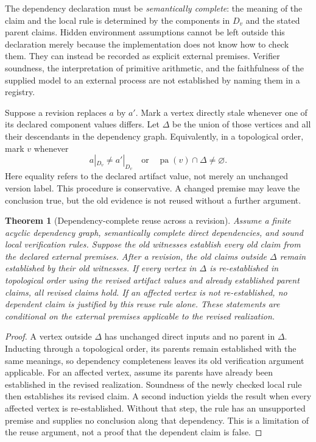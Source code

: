 \documentclass[11pt,letterpaper]{article}
\theoremstyle{plain}
\newtheorem{theorem}{Theorem}[section]
\theoremstyle{definition}
\begin{document}
The dependency declaration must be \emph{semantically complete}: the meaning of the claim and the local rule is determined by the components in $D_v$ and the stated parent claims. Hidden environment assumptions cannot be left outside this declaration merely because the implementation does not know how to check them. They can instead be recorded as explicit external premises. Verifier soundness, the interpretation of primitive arithmetic, and the faithfulness of the supplied model to an external process are not established by naming them in a registry.

Suppose a revision replaces $a$ by $a'$. Mark a vertex directly stale whenever one of its declared component values differs. Let $\Delta$ be the union of those vertices and all their descendants in the dependency graph. Equivalently, in a topological order, mark $v$ whenever
\[
 a|_{D_v}\ne a'|_{D_v}
 \quad\text{or}\quad
 \operatorname{pa}(v)\cap\Delta\ne\varnothing.
\]
Here equality refers to the declared artifact value, not merely an unchanged version label. This procedure is conservative. A changed premise may leave the conclusion true, but the old evidence is not reused without a further argument.

\begin{theorem}[Dependency-complete reuse across a revision]\label{thm:certificate-reuse}
Assume a finite acyclic dependency graph, semantically complete direct dependencies, and sound local verification rules. Suppose the old witnesses establish every old claim from the declared external premises. After a revision, the old claims outside $\Delta$ remain established by their old witnesses. If every vertex in $\Delta$ is re-established in topological order using the revised artifact values and already established parent claims, all revised claims hold. If an affected vertex is not re-established, no dependent claim is justified by this reuse rule alone. These statements are conditional on the external premises applicable to the revised realization.
\end{theorem}
\begin{proof}
A vertex outside $\Delta$ has unchanged direct inputs and no parent in $\Delta$. Inducting through a topological order, its parents remain established with the same meanings, so dependency completeness leaves its old verification argument applicable. For an affected vertex, assume its parents have already been established in the revised realization. Soundness of the newly checked local rule then establishes its revised claim. A second induction yields the result when every affected vertex is re-established. Without that step, the rule has an unsupported premise and supplies no conclusion along that dependency. This is a limitation of the reuse argument, not a proof that the dependent claim is false.
\end{proof}
\end{document}
